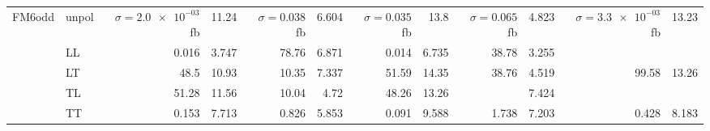\begin{table}[H]
{\begin{tabular}{llrrrrrrrrrr}
\midrule
\multirow{5}{*}{FM6odd}
 & unpol & $\sigma = \num{2.0e-03}$ fb & \num{11.24} & $\sigma = \num{0.038}$ fb & \num{6.604} & $\sigma = \num{0.035}$ fb & \num{13.8} & $\sigma = \num{0.065}$ fb & \num{4.823} & $\sigma = \num{3.3e-03}$ fb & \num{13.23} \\
 & LL & \num{0.016} & \num{3.747} & \num{78.76} & \num{6.871} & \num{0.014} & \num{6.735} & \num{38.78} & \num{3.255} &  &  \\
 & LT & \num{48.5} & \num{10.93} & \num{10.35} & \num{7.337} & \num{51.59} & \num{14.35} & \num{38.76} & \num{4.519} & \num{99.58} & \num{13.26} \\
 & TL & \num{51.28} & \num{11.56} & \num{10.04} & \num{4.72} & \num{48.26} & \num{13.26} &  & \num{7.424} &  &  \\
 & TT & \num{0.153} & \num{7.713} & \num{0.826} & \num{5.853} & \num{0.091} & \num{9.588} & \num{1.738} & \num{7.203} & \num{0.428} & \num{8.183} \\
\bottomrule
\end{tabular}
}%
\end{table}
\newpage
